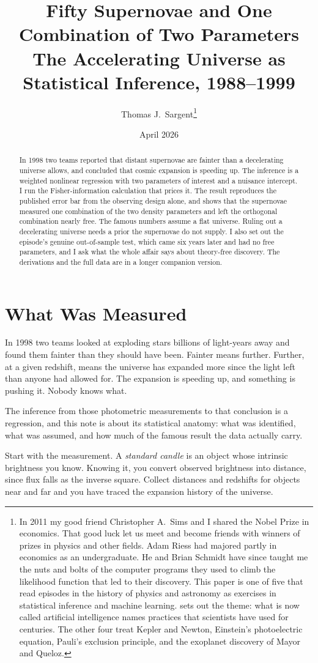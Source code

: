\documentclass[11pt]{article}
\title{Fifty Supernovae and One Combination of Two Parameters\\[2pt]
       \large The Accelerating Universe as Statistical Inference, 1988--1999}
\author{Thomas J.\ Sargent\thanks{%
  In 2011 my good friend Christopher A.\ Sims and I shared the Nobel Prize in
  economics.  That good luck let us meet and become friends with winners of
  prizes in physics and other fields.  Adam Riess had majored partly in
  economics as an undergraduate.  He and Brian Schmidt have since taught me
  the nuts and bolts of the computer programs they used to climb the
  likelihood function that led to their discovery.
  This paper is one of five that read episodes in the
  history of physics and astronomy as exercises in statistical inference and
  machine learning.  \citet{sargent2025sources} sets out the theme: what is
  now called artificial intelligence names practices that scientists have used
  for centuries.  The other four treat Kepler and Newton, Einstein's photoelectric equation,
  Pauli's exclusion principle, and the exoplanet discovery of Mayor and
  Queloz.}}
\date{April 2026}
\begin{document}
\maketitle

\begin{abstract}
\noindent
In 1998 two teams reported that distant supernovae are fainter than a
decelerating universe allows, and concluded that cosmic expansion is speeding
up.  The inference is a weighted nonlinear regression with two parameters of
interest and a nuisance intercept.  I run the Fisher-information calculation
that prices it.  The result reproduces the published error bar from the
observing design alone, and shows that the supernovae measured one combination
of the two density parameters and left the orthogonal combination nearly free.
The famous numbers assume a flat universe.  Ruling out a decelerating universe
needs a prior the supernovae do not supply.  I also set out the episode's
genuine out-of-sample test, which came six years later and had no free
parameters, and I ask what the whole affair says about theory-free discovery.
The derivations and the full data are in a longer companion version.
\end{abstract}

\section{What Was Measured}

In 1998 two teams looked at exploding stars billions of light-years away and
found them fainter than they should have been.  Fainter means further.
Further, at a given redshift, means the universe has expanded more since the
light left than anyone had allowed for.  The expansion is speeding up, and
something is pushing it.  Nobody knows what.

The inference from those photometric measurements to that conclusion is a
regression, and this note is about its statistical anatomy: what was
identified, what was assumed, and how much of the famous result the data
actually carry.

Start with the measurement.  A \emph{standard candle} is an object whose
intrinsic brightness you know.  Knowing it, you convert observed brightness
into distance, since flux falls as the inverse square.  Collect distances and
redshifts for objects near and far and you have traced the expansion history
of the universe.
\end{document}
